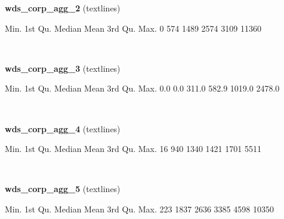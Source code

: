 \documentclass[]{article}
\newenvironment{Shaded}{\begin{snugshade}}{\end{snugshade}}
\newcommand{\DecValTok}[1]{\textcolor[rgb]{0.00,0.00,0.81}{{#1}}}
\newcommand{\FloatTok}[1]{\textcolor[rgb]{0.00,0.00,0.81}{{#1}}}
\newcommand{\NormalTok}[1]{{#1}}
\begin{document}
\textbf{wds\_corp\_agg\_2} (textlines)

\begin{Shaded}
\begin{Highlighting}[]
   \NormalTok{Min. 1st Qu.  Median    Mean 3rd Qu.    Max. }
      \DecValTok{0}     \DecValTok{574}    \DecValTok{1489}    \DecValTok{2574}    \DecValTok{3109}   \DecValTok{11360} 
\end{Highlighting}
\end{Shaded}

~

\vspace{1em}

\textbf{wds\_corp\_agg\_3} (textlines)

\begin{Shaded}
\begin{Highlighting}[]
   \NormalTok{Min. 1st Qu.  Median    Mean 3rd Qu.    Max. }
    \FloatTok{0.0}     \FloatTok{0.0}   \FloatTok{311.0}   \FloatTok{582.9}  \FloatTok{1019.0}  \FloatTok{2478.0} 
\end{Highlighting}
\end{Shaded}

~

\vspace{1em}

\textbf{wds\_corp\_agg\_4} (textlines)

\begin{Shaded}
\begin{Highlighting}[]
   \NormalTok{Min. 1st Qu.  Median    Mean 3rd Qu.    Max. }
     \DecValTok{16}     \DecValTok{940}    \DecValTok{1340}    \DecValTok{1421}    \DecValTok{1701}    \DecValTok{5511} 
\end{Highlighting}
\end{Shaded}

~

\vspace{1em}

\textbf{wds\_corp\_agg\_5} (textlines)

\begin{Shaded}
\begin{Highlighting}[]
   \NormalTok{Min. 1st Qu.  Median    Mean 3rd Qu.    Max. }
    \DecValTok{223}    \DecValTok{1837}    \DecValTok{2636}    \DecValTok{3385}    \DecValTok{4598}   \DecValTok{10350} 
\end{Highlighting}
\end{Shaded}

~

\vspace{1em}
\end{document}
